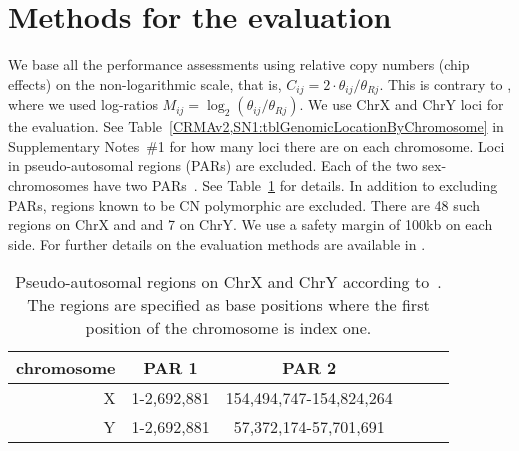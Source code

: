\documentclass[10pt,a4paper]{article}
\begin{document}
\section{Methods for the evaluation}
We base all the performance assessments using relative copy numbers (chip effects) on the non-logarithmic scale, that is, $C_{ij}=2\cdot\theta_{ij}/\theta_{Rj}$.  This is contrary to \cite{BengtssonH_etal_2008}, where we used log-ratios $M_{ij}=\log_2(\theta_{ij}/\theta_{Rj})$.  
We use ChrX and ChrY loci for the evaluation.  See Table~\ref{CRMAv2,SN1:tblGenomicLocationByChromosome} in Supplementary Notes~\#1 for how many loci there are on each chromosome.
Loci in pseudo-autosomal regions (PARs) are excluded.  Each of the two sex-chromosomes have two PARs~\citep{BlaschkeRappold_2006}.  See Table~\ref{tblPARs} for details.
In addition to excluding PARs, regions known to be CN polymorphic \citep{RedonR_etal_2006} are excluded.  There are 48 such regions on ChrX and and 7 on ChrY.  We use a safety margin of 100kb on each side.
For further details on the evaluation methods are available in \cite{BengtssonH_etal_2008}.

\begin{table}[hp]
\begin{center}
\begin{tabular}{|r|c|c|c|cc|}
\hline
chromosome & PAR 1 & PAR 2 \\
\hline
\hline
X  & 1-2,692,881 & 154,494,747-154,824,264 \\
Y  & 1-2,692,881 &  57,372,174-57,701,691 \\
\hline
\end{tabular}
\end{center}
\caption{Pseudo-autosomal regions on ChrX and ChrY according to~\citet{BlaschkeRappold_2006}.  The regions are specified as base positions where the first position of the chromosome is index one.}
\label{tblPARs}
\end{table}
\end{document}
